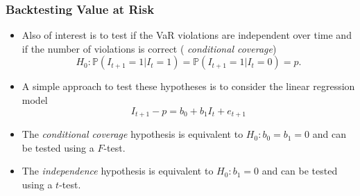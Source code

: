 \begin{frame}%

\frametitle{Backtesting Value at Risk}

\begin{itemize}
\item Also of interest is to test if the VaR violations are independent over
time and if the number of violations is correct (\emph{\color{red}%
conditional coverage})
\begin{equation*}
H_{0}:\mathbb{P} (I_{t+1}=1|I_{t}=1)=\mathbb{P} (I_{t+1}=1|I_{t}=0)=p.
\end{equation*}

\item A simple approach to test these hypotheses is to consider the linear
regression model
\begin{equation*}
I_{t+1}-p=b_{0}+b_{1}I_{t}+e_{t+1}
\end{equation*}

\item The \emph{\color{red}conditional coverage} hypothesis is equivalent to
$H_{0}:b_{0}=b_{1}=0$ and can be tested using a $F$-test.

\item The \emph{\color{red}independence} hypothesis is equivalent to $%
H_{0}:b_{1}=0$ and can be tested using a $t$-test.
\end{itemize}

\end{frame}%

